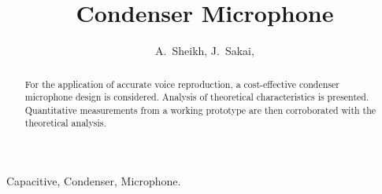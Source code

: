 \documentclass[journal]{IEEEtran}
\begin{document}
%
\title{Condenser Microphone}
%
%
%

\author{A.~Sheikh,
				J.~Sakai,
}


% 


\maketitle


\begin{abstract}
For the application of accurate voice reproduction, a cost-effective condenser microphone design is considered. Analysis of theoretical characteristics is presented. Quantitative measurements from a working prototype are then corroborated with the theoretical analysis.
\end{abstract}

\begin{IEEEkeywords}
Capacitive, Condenser, Microphone.
\end{IEEEkeywords}

%
\IEEEpeerreviewmaketitle
\end{document}
